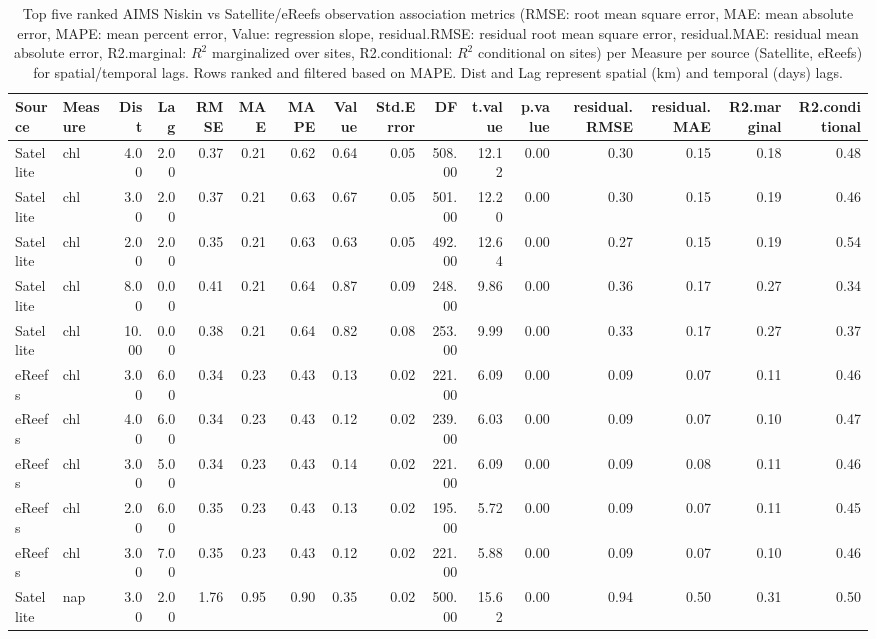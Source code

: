 \begin{table}[ht]
\centering
\caption{Top five ranked AIMS Niskin vs Satellite/eReefs observation association metrics (RMSE: root mean square error, MAE: mean absolute error, MAPE: mean percent error, Value: regression slope, residual.RMSE: residual root mean square error, residual.MAE: residual mean absolute error, R2.marginal: $R^2$ marginalized over sites, R2.conditional: $R^2$ conditional on sites) per Measure per source (Satellite, eReefs) for spatial/temporal lags.  Rows ranked and filtered based on MAPE. Dist and Lag represent spatial (km) and temporal (days) lags.} 
\label{tab:comp.all.mpe.sum.max}
\begingroup\scriptsize
\begin{tabular}{llrrrrrrrrrrrrrr}
  \toprule
Source & Measure & Dist & Lag & RMSE & MAE & MAPE & Value & Std.Error & DF & t.value & p.value & residual.RMSE & residual.MAE & R2.marginal & R2.conditional \\ 
  \midrule
Satellite & chl & 4.00 & 2.00 & 0.37 & 0.21 & 0.62 & 0.64 & 0.05 & 508.00 & 12.12 & 0.00 & 0.30 & 0.15 & 0.18 & 0.48 \\ 
  Satellite & chl & 3.00 & 2.00 & 0.37 & 0.21 & 0.63 & 0.67 & 0.05 & 501.00 & 12.20 & 0.00 & 0.30 & 0.15 & 0.19 & 0.46 \\ 
  Satellite & chl & 2.00 & 2.00 & 0.35 & 0.21 & 0.63 & 0.63 & 0.05 & 492.00 & 12.64 & 0.00 & 0.27 & 0.15 & 0.19 & 0.54 \\ 
  Satellite & chl & 8.00 & 0.00 & 0.41 & 0.21 & 0.64 & 0.87 & 0.09 & 248.00 & 9.86 & 0.00 & 0.36 & 0.17 & 0.27 & 0.34 \\ 
  Satellite & chl & 10.00 & 0.00 & 0.38 & 0.21 & 0.64 & 0.82 & 0.08 & 253.00 & 9.99 & 0.00 & 0.33 & 0.17 & 0.27 & 0.37 \\ 
  eReefs & chl & 3.00 & 6.00 & 0.34 & 0.23 & 0.43 & 0.13 & 0.02 & 221.00 & 6.09 & 0.00 & 0.09 & 0.07 & 0.11 & 0.46 \\ 
  eReefs & chl & 4.00 & 6.00 & 0.34 & 0.23 & 0.43 & 0.12 & 0.02 & 239.00 & 6.03 & 0.00 & 0.09 & 0.07 & 0.10 & 0.47 \\ 
  eReefs & chl & 3.00 & 5.00 & 0.34 & 0.23 & 0.43 & 0.14 & 0.02 & 221.00 & 6.09 & 0.00 & 0.09 & 0.08 & 0.11 & 0.46 \\ 
  eReefs & chl & 2.00 & 6.00 & 0.35 & 0.23 & 0.43 & 0.13 & 0.02 & 195.00 & 5.72 & 0.00 & 0.09 & 0.07 & 0.11 & 0.45 \\ 
  eReefs & chl & 3.00 & 7.00 & 0.35 & 0.23 & 0.43 & 0.12 & 0.02 & 221.00 & 5.88 & 0.00 & 0.09 & 0.07 & 0.10 & 0.46 \\ 
   \midrule
Satellite & nap & 3.00 & 2.00 & 1.76 & 0.95 & 0.90 & 0.35 & 0.02 & 500.00 & 15.62 & 0.00 & 0.94 & 0.50 & 0.31 & 0.50 \\ 

\end{tabular}
\end{table}
